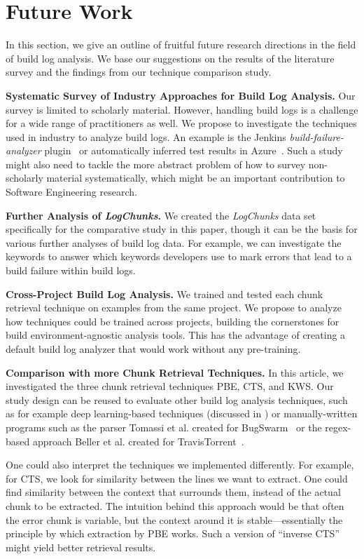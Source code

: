 \documentclass[10pt,journal,compsoc]{IEEEtran}
\begin{document}
\section{Future Work}
In this section, we give an outline of fruitful future
research directions in the field of build log analysis.
We base our
suggestions on the results of the literature survey and the
findings from our technique comparison study.

\textbf{Systematic Survey of Industry Approaches for Build
Log Analysis.}	Our survey is limited to scholarly material.
However,
handling build logs is a challenge for a wide range of practitioners
as well.
We propose to investigate the techniques used in industry to
analyze build logs.
An example is the
Jenkins \emph{build-failure-analyzer}
plugin~\cite{jenkins2020failure-analyzer} or automatically inferred
test results in Azure~\cite{azure2020inferred}.
Such a study might
also need to tackle the more abstract problem of how to survey
non-scholarly material systematically, which might be an important
contribution to Software Engineering research.

\textbf{Further Analysis of \emph{LogChunks}.}
We created the
\emph{LogChunks} data set \cite{brandt2020logchunks} specifically for
the comparative
study in this paper, though it can be the basis for various further
analyses of build log data.
For example, we can investigate the keywords to answer which
keywords developers use to mark errors that lead to a build failure
within build logs.

\textbf{Cross-Project Build Log Analysis.}
We trained and
tested each chunk retrieval technique on examples from the same
project.
We propose to analyze how techniques could be trained
across projects, building the cornerstones for build
environment-agnostic analysis tools.
This has the advantage of creating
a default build log analyzer that would work without any pre-training.

\textbf{Comparison with more Chunk Retrieval Techniques.}
In this article, we investigated the three chunk retrieval techniques PBE,
CTS, and
KWS\@.
Our study design can be reused to evaluate other build log
analysis techniques, such as for example deep learning-based
techniques (discussed in ) or manually-written
programs such as the parser Tomassi et al.
created for
BugSwarm~\cite{tomassi2019bugswarm} or the regex-based approach
Beller et al.
created for TravisTorrent~\cite{beller2017oops}.

One could also interpret the techniques we implemented
differently.
For example, for CTS, we look for similarity between the
lines we want to extract.
One could find similarity between the
context that surrounds them, instead of the actual chunk to be
extracted.
The intuition behind this approach would be that often the
error chunk is variable, but the context around it is
stable---essentially the principle by which extraction by PBE
works.
Such a version of ``inverse CTS'' might yield better retrieval
results.
\end{document}

